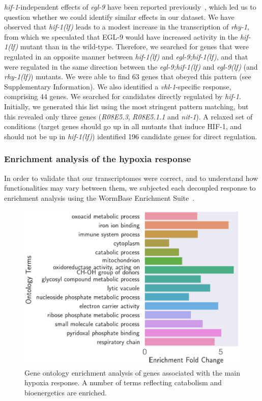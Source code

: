 \documentclass[9pt,twocolumn,twoside]{pnas-new}
\newcommand{\gene}[1]{\emph{#1}}
\newcommand{\egl}{\emph{egl-9(lf)}}
\newcommand{\rhy}{\emph{rhy-1(lf)}}
\newcommand{\eglhif}{\emph{egl-9;hif-1(lf)}}
\newcommand{\hif}{\emph{hif-1(lf)}}
\newcommand{\eglp}{EGL-9}
\newcommand{\hifp}{HIF-1}
\newcommand{\egltargets}{63}
\newcommand{\vhltargets}{44}
\newcommand{\hiftargets}{196}
\begin{document}
\gene{hif-1}-independent effects of \gene{egl-9} have been reported
previously~\cite{Park2012}, which led us to question whether we could identify
similar effects in our dataset. We have observed that \hif{} leads to a modest
increase in the transcription of \gene{rhy-1}, from which we speculated that
\eglp{} would have increased activity in the \hif{} mutant than in the wild-type.
Therefore, we searched for genes that were regulated in an opposite manner between
\hif{} and \eglhif{}, and that were regulated in the same direction between the
\eglhif{} and \egl{} (and \rhy{}) mutants. We were able to find \egltargets{}
genes that obeyed this pattern (see Supplementary Information). We also identified
a \gene{vhl-1}-specific response, comprising \vhltargets{} genes. We searched
for candidates directly regulated by \gene{hif-1}. Initially, we generated this
list using the most stringent pattern matching, but this revealed only three genes
(\emph{R08E5.3}, \emph{R08E5.1.1} and \emph{nit-1}). A relaxed set of conditions
(target genes should go up in all mutants that induce \hifp{}, and should not be
up in \hif{}) identified \hiftargets{} candidate genes for direct regulation.

\subsubsection*{Enrichment analysis of the hypoxia response}
\label{sub:ea_hypoxia}
In order to validate that our transcriptomes were correct, and to understand how
functionalities may vary between them, we subjected each decoupled response to
enrichment analysis using the WormBase Enrichment Suite~\cite{Angeles-Albores2016}.

\begin{figure}[tbhp]
\centering
\includegraphics[width=\linewidth]{figs/hypoxia_response_gea.pdf}
\caption{
Gene ontology enrichment analysis of genes associated with the main hypoxia response.
A number of terms reflecting catabolism and bioenergetics are enriched.
}
\label{fig:hyp_gea}
\end{figure}
\end{document}
